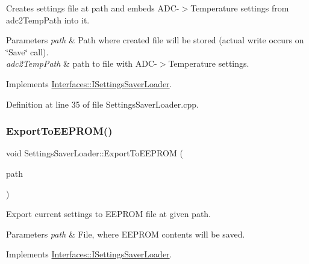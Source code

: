 Creates settings file at path and embeds A\+D\+C-\/$>$Temperature settings from adc2\+Temp\+Path into it. 


\begin{DoxyParams}{Parameters}
{\em path} & Path where created file will be stored (actual write occurs on \char`\"{}\+Save\char`\"{} call). \\
\hline
{\em adc2\+Temp\+Path} & path to file with A\+D\+C-\/$>$Temperature settings. \\
\hline
\end{DoxyParams}


Implements \hyperlink{class_interfaces_1_1_i_settings_saver_loader_a67e729cc53f53b6bdeb534dc62000531}{Interfaces\+::\+I\+Settings\+Saver\+Loader}.



Definition at line 35 of file Settings\+Saver\+Loader.\+cpp.

\mbox{\label{class_settings_saver_loader_a2a3e3c7f6f1f521b9423db4d63ddae74}} 
\subsubsection{\texorpdfstring{Export\+To\+E\+E\+P\+R\+O\+M()}{ExportToEEPROM()}}
{\footnotesize\ttfamily void Settings\+Saver\+Loader\+::\+Export\+To\+E\+E\+P\+R\+OM (\begin{DoxyParamCaption}\item[{Q\+String}]{path }\end{DoxyParamCaption})\hspace{0.3cm}{\ttfamily [virtual]}}



Export current settings to E\+E\+P\+R\+OM file at given path. 


\begin{DoxyParams}{Parameters}
{\em path} & File, where E\+E\+P\+R\+OM contents will be saved. \\
\hline
\end{DoxyParams}


Implements \hyperlink{class_interfaces_1_1_i_settings_saver_loader_a4f855492363276d81031d931a72a49a3}{Interfaces\+::\+I\+Settings\+Saver\+Loader}.



